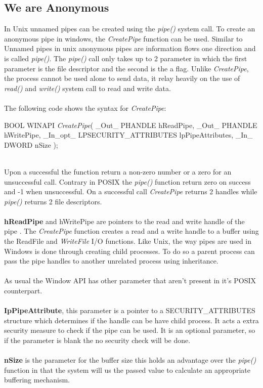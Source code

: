 \documentclass[a4paper]{article}
\begin{document}
\subsection{ We are Anonymous}
In Unix unnamed pipes can be created using the \textit{pipe()} system call. To create an anonymous pipe in windows, the \textit{CreatePipe} function can be used. Similar to Unnamed pipes in unix anonymous pipes are information flows one direction and is called \textit{pipe()}. The \textit{pipe()} call only takes up to 2 parameter in which the first parameter is the file descriptor and the second is the a flag. Unlike \textit{CreatePipe}, the process cannot be used alone to send data, it relay heavily on the use of \textit{read()} and \textit{write()} system call to read and write data.\\
\\
The following code shows the syntax for \textit{CreatePipe}: \\
\begin{code}

BOOL WINAPI \textit{CreatePipe}(
	_Out_     PHANDLE hReadPipe,
	_Out_     PHANDLE hWritePipe,
	_In_opt_  LPSECURITY_ATTRIBUTES lpPipeAttributes,
	_In_      DWORD nSize
);

\end{code}\\
Upon a successful the function return a non-zero number or a zero for an unsuccessful call. Contrary in POSIX the \textit{pipe()} function return zero on success and -1 when unsuccessful. On a successful call \textit{CreatePipe} returns 2 handles while \textit{pipe()} returns 2 file descriptors. \\
\\
\textbf{hReadPipe} and {hWritePipe} are pointers to the read and write handle of the pipe . The \textit{CreatePipe} function creates a read and a write handle to a buffer using the ReadFile and \textit{WriteFile} I/O functions. Like Unix, the way pipes are used in Windows is done through creating child processes. To do so a parent process can pass the pipe handles to another unrelated process using inheritance.\\
\\
As usual the Window API has other parameter that aren't present in it’s POSIX counterpart. \\
\\
\textbf{IpPipeAttribute}, this parameter is a pointer to a SECURITY\_ATTRIBUTES structure which determines if the handle can be have child process. It acts a extra security measure to check if the pipe can be used. It is an optional parameter, so if the parameter is blank the no security check will be done.\\
\\
\textbf{nSize} is the parameter for the buffer size this holds an advantage over the \textit{pipe()} function in that the system will us the passed value to calculate an appropriate buffering mechanism.
\end{document}
